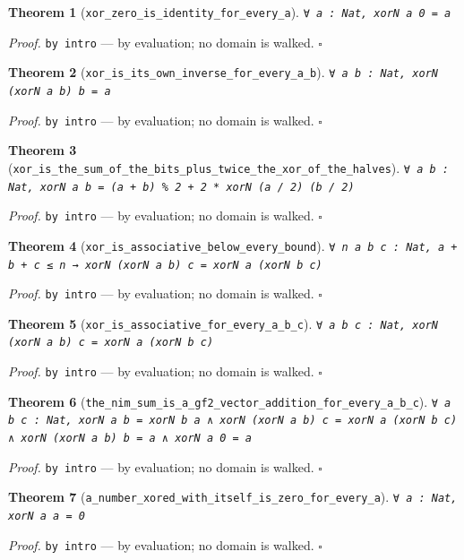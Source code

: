 \documentclass[11pt]{article}
\newtheorem{theorem}{Theorem}[section]
\begin{document}
\begin{theorem}[\texttt{xor\_zero\_is\_identity\_for\_every\_a}]
\texttt{∀ a : Nat, xorN a 0 = a}
\end{theorem}
\noindent\emph{Proof.} \texttt{by
  intro} --- by evaluation; no domain is walked. \hfill$\square$

\begin{theorem}[\texttt{xor\_is\_its\_own\_inverse\_for\_every\_a\_b}]
\texttt{∀ a b : Nat, xorN (xorN a b) b = a}
\end{theorem}
\noindent\emph{Proof.} \texttt{by
  intro} --- by evaluation; no domain is walked. \hfill$\square$

\begin{theorem}[\texttt{xor\_is\_the\_sum\_of\_the\_bits\_plus\_twice\_the\_xor\_of\_the\_halves}]
\texttt{∀ a b : Nat, xorN a b = (a + b) \% 2 + 2 * xorN (a / 2) (b / 2)}
\end{theorem}
\noindent\emph{Proof.} \texttt{by
  intro} --- by evaluation; no domain is walked. \hfill$\square$

\begin{theorem}[\texttt{xor\_is\_associative\_below\_every\_bound}]
\texttt{∀ n a b c : Nat, a + b + c ≤ n → xorN (xorN a b) c = xorN a (xorN b c)}
\end{theorem}
\noindent\emph{Proof.} \texttt{by
  intro} --- by evaluation; no domain is walked. \hfill$\square$

\begin{theorem}[\texttt{xor\_is\_associative\_for\_every\_a\_b\_c}]
\texttt{∀ a b c : Nat, xorN (xorN a b) c = xorN a (xorN b c)}
\end{theorem}
\noindent\emph{Proof.} \texttt{by
  intro} --- by evaluation; no domain is walked. \hfill$\square$

\begin{theorem}[\texttt{the\_nim\_sum\_is\_a\_gf2\_vector\_addition\_for\_every\_a\_b\_c}]
\texttt{∀ a b c : Nat, xorN a b = xorN b a ∧ xorN (xorN a b) c = xorN a (xorN b c) ∧ xorN (xorN a b) b = a ∧ xorN a 0 = a}
\end{theorem}
\noindent\emph{Proof.} \texttt{by
  intro} --- by evaluation; no domain is walked. \hfill$\square$

\begin{theorem}[\texttt{a\_number\_xored\_with\_itself\_is\_zero\_for\_every\_a}]
\texttt{∀ a : Nat, xorN a a = 0}
\end{theorem}
\noindent\emph{Proof.} \texttt{by
  intro} --- by evaluation; no domain is walked. \hfill$\square$
\end{document}
